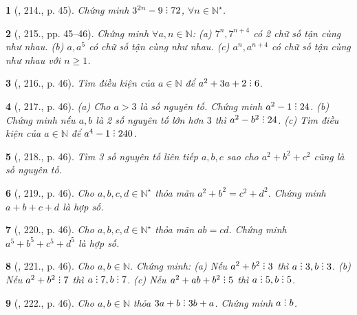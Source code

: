\documentclass{article}
\newtheorem{baitoan}{}
\DeclareRobustCommand{\divby}{%
	\mathrel{\vbox{\baselineskip.65ex\lineskiplimit0pt\hbox{.}\hbox{.}\hbox{.}}}%
}
\begin{document}
\begin{baitoan}[\cite{Binh_Toan_8_tap_1}, 214., p. 45]
	Chứng minh $3^{2n} - 9\divby72$, $\forall n\in\mathbb{N}^\star$.
\end{baitoan}

\begin{baitoan}[\cite{Binh_Toan_8_tap_1}, 215., pp. 45--46]
	Chứng minh $\forall a,n\in\mathbb{N}$: (a) $7^n,7^{n+4}$ có 2 chữ số tận cùng như nhau. (b) $a,a^5$ có chữ số tận cùng như nhau. (c) $a^n,a^{n+4}$ có chữ số tận cùng như nhau với $n\ge1$.
\end{baitoan}

\begin{baitoan}[\cite{Binh_Toan_8_tap_1}, 216., p. 46]
	Tìm điều kiện của $a\in\mathbb{N}$ để $a^2 + 3a + 2\divby6$.
\end{baitoan}

\begin{baitoan}[\cite{Binh_Toan_8_tap_1}, 217., p. 46]
	(a) Cho $a > 3$ là số nguyên tố. Chứng minh $a^2 - 1\divby24$. (b) Chứng minh nếu $a,b$ là 2 số nguyên tố lớn hơn $3$ thì $a^2 - b^2\divby24$. (c) Tìm điều kiện của $a\in\mathbb{N}$ để $a^4 - 1\divby240$.
\end{baitoan}

\begin{baitoan}[\cite{Binh_Toan_8_tap_1}, 218., p. 46]
	Tìm 3 số nguyên tố liên tiếp $a,b,c$ sao cho $a^2 + b^2 + c^2$ cũng là số nguyên tố.
\end{baitoan}

\begin{baitoan}[\cite{Binh_Toan_8_tap_1}, 219., p. 46]
	Cho $a,b,c,d\in\mathbb{N}^\star$ thỏa mãn $a^2 + b^2 = c^2 + d^2$. Chứng minh $a + b + c + d$ là hợp số.
\end{baitoan}

\begin{baitoan}[\cite{Binh_Toan_8_tap_1}, 220., p. 46]
	Cho $a,b,c,d\in\mathbb{N}^\star$ thỏa mãn $ab = cd$. Chứng minh $a^5 + b^5 + c^5 + d^5$ là hợp số.
\end{baitoan}

\begin{baitoan}[\cite{Binh_Toan_8_tap_1}, 221., p. 46]
	Cho $a,b\in\mathbb{N}$. Chứng minh: (a) Nếu $a^2 + b^2\divby3$ thì $a\divby3,b\divby3$. (b) Nếu $a^2 + b^2\divby7$ thì $a\divby7,b\divby7$. (c) Nếu $a^2 + ab + b^2\divby5$ thì $a\divby5,b\divby5$.
\end{baitoan}

\begin{baitoan}[\cite{Binh_Toan_8_tap_1}, 222., p. 46]
	Cho $a,b\in\mathbb{N}$ thỏa $3a + b\divby3b + a$. Chứng minh $a\divby b$.
\end{baitoan}
\end{document}
